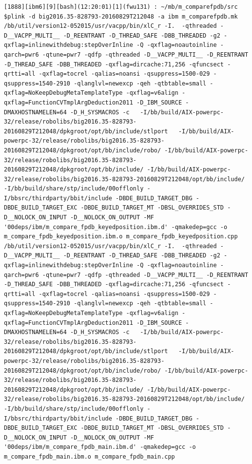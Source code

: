 \documentclass[8pt,]{article}
\begin{document}
\begin{verbatim}
[1888][ibm6][9][bash](12:20:01)[1](fwu131) : ~/mb/m_comparefpdb/src
$plink -d big2016.35-828793-20160829T212048 -a ibm m_comparefpdb.mk
/bb/util/version12-052015/usr/vacpp/bin/xlC_r -I.  -qthreaded -D__VACPP_MULTI__ -D_REENTRANT -D_THREAD_SAFE -DBB_THREADED -g2 -qxflag=inlinewithdebug:stepOverInline -Q -qxflag=noautoinline -qarch=pwr6 -qtune=pwr7 -qdfp -qthreaded -D__VACPP_MULTI__ -D_REENTRANT -D_THREAD_SAFE -DBB_THREADED -qxflag=dircache:71,256 -qfuncsect -qrtti=all -qxflag=tocrel -qalias=noansi -qsuppress=1500-029 -qsuppress=1540-2910 -qlanglvl=newexcp -qeh -qtbtable=small -qxflag=NoKeepDebugMetaTemplateType -qxflag=v6align -qxflag=FunctionCVTmplArgDeduction2011 -D_IBM_SOURCE -DMAXHOSTNAMELEN=64 -D_H_SYSMACROS -c   -I/bb/build/AIX-powerpc-32/release/robolibs/big2016.35-828793-20160829T212048/dpkgroot/opt/bb/include/stlport   -I/bb/build/AIX-powerpc-32/release/robolibs/big2016.35-828793-20160829T212048/dpkgroot/opt/bb/include/robo/ -I/bb/build/AIX-powerpc-32/release/robolibs/big2016.35-828793-20160829T212048/dpkgroot/opt/bb/include/ -I/bb/build/AIX-powerpc-32/release/robolibs/big2016.35-828793-20160829T212048/opt/bb/include/ -I/bb/build/share/stp/include/00offlonly -I/bbsrc/thirdparty/bbit/include -DBDE_BUILD_TARGET_DBG -DBDE_BUILD_TARGET_EXC -DBDE_BUILD_TARGET_MT -DBSL_OVERRIDES_STD -D__NOLOCK_ON_INPUT -D__NOLOCK_ON_OUTPUT -MF '00deps/ibm/m_compare_fpdb_keyedposition.ibm.d' -qmakedep=gcc -o m_compare_fpdb_keyedposition.ibm.o m_compare_fpdb_keyedposition.cpp
/bb/util/version12-052015/usr/vacpp/bin/xlC_r -I.  -qthreaded -D__VACPP_MULTI__ -D_REENTRANT -D_THREAD_SAFE -DBB_THREADED -g2 -qxflag=inlinewithdebug:stepOverInline -Q -qxflag=noautoinline -qarch=pwr6 -qtune=pwr7 -qdfp -qthreaded -D__VACPP_MULTI__ -D_REENTRANT -D_THREAD_SAFE -DBB_THREADED -qxflag=dircache:71,256 -qfuncsect -qrtti=all -qxflag=tocrel -qalias=noansi -qsuppress=1500-029 -qsuppress=1540-2910 -qlanglvl=newexcp -qeh -qtbtable=small -qxflag=NoKeepDebugMetaTemplateType -qxflag=v6align -qxflag=FunctionCVTmplArgDeduction2011 -D_IBM_SOURCE -DMAXHOSTNAMELEN=64 -D_H_SYSMACROS -c   -I/bb/build/AIX-powerpc-32/release/robolibs/big2016.35-828793-20160829T212048/dpkgroot/opt/bb/include/stlport   -I/bb/build/AIX-powerpc-32/release/robolibs/big2016.35-828793-20160829T212048/dpkgroot/opt/bb/include/robo/ -I/bb/build/AIX-powerpc-32/release/robolibs/big2016.35-828793-20160829T212048/dpkgroot/opt/bb/include/ -I/bb/build/AIX-powerpc-32/release/robolibs/big2016.35-828793-20160829T212048/opt/bb/include/ -I/bb/build/share/stp/include/00offlonly -I/bbsrc/thirdparty/bbit/include -DBDE_BUILD_TARGET_DBG -DBDE_BUILD_TARGET_EXC -DBDE_BUILD_TARGET_MT -DBSL_OVERRIDES_STD -D__NOLOCK_ON_INPUT -D__NOLOCK_ON_OUTPUT -MF '00deps/ibm/m_compare_fpdb_main.ibm.d' -qmakedep=gcc -o m_compare_fpdb_main.ibm.o m_compare_fpdb_main.cpp

\end{verbatim}
\end{document}
